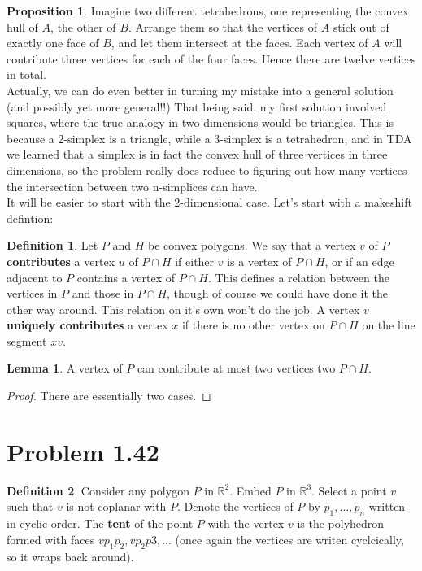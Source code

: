 \documentclass[12pt]{article}
\newcommand{\R}{\mathbb{R}}
\theoremstyle{definition}
\newtheorem*{definition}{Definition}
\newtheorem{lemma}{Lemma}
\newtheorem{proposition}{Proposition}
\begin{document}
\begin{proposition}
Imagine two different tetrahedrons, one representing the convex hull of $A$, the other of $B$. Arrange them so that the vertices of $A$ stick out of exactly one face of $B$, and let them intersect at the faces. Each vertex of $A$ will contribute three vertices for each of the four faces. Hence there are twelve vertices in total.  \\


Actually, we can do even better in turning my mistake into a general solution (and possibly yet more general!!) That being said, my first solution involved squares, where the true analogy in two dimensions would be triangles. This is because a 2-simplex is a triangle, while a 3-simplex is a tetrahedron, and in TDA we learned that a simplex is in fact the convex hull of three vertices in three dimensions, so the problem really does reduce to figuring out how many vertices the intersection between two n-simplices can have.\\


It will be easier to start with the 2-dimensional case. Let's start with a makeshift defintion:

\begin{definition}
Let $P$ and $H$ be convex polygons. We say that a vertex $v$ of $P$ \textbf{contributes} a vertex $u$ of $P\cap H$ if either $v$ is a vertex of $P\cap H$, or if an edge adjacent to $P$ contains a vertex of $P\cap H$. This defines a relation between the vertices in $P$ and those in $P\cap H$, though of course we could have done it the other way around. This relation on it's own won't do the job. A vertex $v$ \textbf{uniquely contributes} a vertex $x$ if there is no other vertex on $P\cap H$ on the line segment $xv$. 
\end{definition}

\begin{lemma}
A vertex of $P$ can contribute at most two vertices two $P\cap H$. 
\end{lemma}
\begin{proof}
There are essentially two cases. 
\end{proof}

\end{proposition}

\section{Problem 1.42}


\begin{definition} Consider any polygon $P$ in $\R^2$. Embed $P$ in $\R^3$. Select a point $v$ such that $v$ is not coplanar with $P$. Denote the vertices of $P$ by $p_1,\dots,p_n$ written in cyclic order. The \textbf{tent} of the point $P$ with the vertex $v$ is the polyhedron formed with faces $vp_1p_2,vp_2p3, ...$ (once again the vertices are writen cyclcically, so it wraps back around).
\end{definition}
\end{document}
